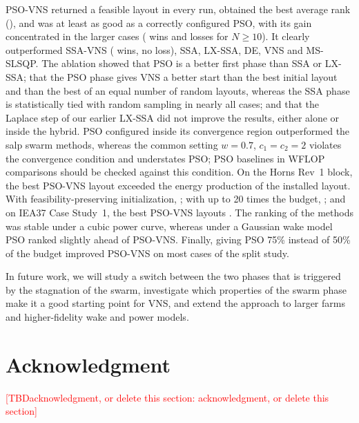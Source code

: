 \documentclass[journal,twoside]{IEEEtran}
\newcommand{\TBD}[1]{\textcolor{red}{[TBD\ifx\relax#1\relax\else: #1\fi]}}
\begin{document}
PSO-VNS returned a feasible layout in every run, obtained the best average rank (\NRankPSOVNS), and was at least as good as a correctly configured PSO, with its gain concentrated in the larger cases (\NWtlPSOLargeW{} wins and \NWtlPSOLargeL{} losses for $N\ge10$). It clearly outperformed SSA-VNS (\NWtlSSAVNSW{} wins, no loss), SSA, LX-SSA, DE, VNS and MS-SLSQP. The ablation showed that PSO is a better first phase than SSA or LX-SSA; that the PSO phase gives VNS a better start than the best initial layout and than the best of an equal number of random layouts, whereas the SSA phase is statistically tied with random sampling in nearly all cases; and that the Laplace step of our earlier LX-SSA did not improve the results, either alone or inside the hybrid. PSO configured inside its convergence region outperformed the salp swarm methods, whereas the common setting $w=0.7$, $c_1=c_2=2$ violates the convergence condition and understates PSO; PSO baselines in WFLOP comparisons should be checked against this condition. On the Horns Rev~1 block, the best PSO-VNS layout exceeded the energy production of the installed layout. With feasibility-preserving initialization, \NFeasInitPhrase; with up to 20 times the budget, \NBudgetPhrase; and on IEA37 Case Study~1, the best PSO-VNS layouts \NIEAPhrase. The ranking of the methods was stable under a cubic power curve, whereas under a Gaussian wake model PSO ranked slightly ahead of PSO-VNS. Finally, giving PSO 75\% instead of 50\% of the budget improved PSO-VNS on most cases of the split study.

In future work, we will study a switch between the two phases that is triggered by the stagnation of the swarm, investigate which properties of the swarm phase make it a good starting point for VNS, and extend the approach to larger farms and higher-fidelity wake and power models.

\section*{Acknowledgment}
\TBD{acknowledgment, or delete this section}
\end{document}
